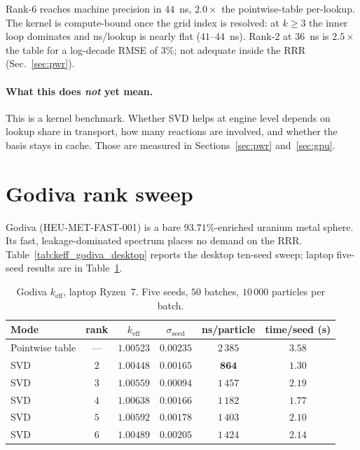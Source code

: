 \documentclass[11pt,a4paper]{article}
\begin{document}
Rank-$6$ reaches machine precision in $44$~ns, $2.0\times$
the pointwise-table per-lookup. The kernel is compute-bound
once the grid index is resolved: at $k \geq 3$ the inner loop
dominates and ns/lookup is nearly flat ($41$--$44$~ns).
Rank-$2$ at $36$~ns is $2.5\times$ the table for a log-decade
RMSE of $3\%$; not adequate inside the RRR
(Sec.~\ref{sec:pwr}).

\paragraph{What this does \emph{not} yet mean.}
This is a kernel benchmark. Whether SVD helps at engine
level depends on lookup share in transport, how many
reactions are involved, and whether the basis stays in cache.
Those are measured in Sections~\ref{sec:pwr} and~\ref{sec:gpu}.

\section{Godiva rank sweep}
\label{sec:godiva}

Godiva (HEU-MET-FAST-001) is a bare $93.71\%$-enriched
uranium metal sphere. Its fast, leakage-dominated spectrum
places no demand on the RRR.
Table~\ref{tab:keff_godiva_desktop} reports the desktop ten-seed
sweep; laptop five-seed results are in
Table~\ref{tab:keff_godiva}.

\begin{table}[htb]
\centering
\caption{Godiva $k_\text{eff}$, laptop Ryzen~$7$. Five seeds,
$50$ batches, $10\,000$ particles per batch.}
\label{tab:keff_godiva}
\begin{tabular}{@{}lccccc@{}}
\toprule
Mode & rank & $k_\text{eff}$ & $\sigma_\text{seed}$ & ns/particle & time/seed (s) \\
\midrule
Pointwise table & ---  & $1.00523$ & $0.00235$ & $2\,385$ & $3.58$ \\
SVD & $2$  & $1.00448$ & $0.00165$ & $\mathbf{864}$  & $\mathbf{1.30}$ \\
SVD & $3$  & $1.00559$ & $0.00094$ & $1\,457$ & $2.19$ \\
SVD & $4$  & $1.00638$ & $0.00166$ & $1\,182$ & $1.77$ \\
SVD & $5$  & $1.00592$ & $0.00178$ & $1\,403$ & $2.10$ \\
SVD & $6$  & $1.00489$ & $0.00205$ & $1\,424$ & $2.14$ \\
\bottomrule
\end{tabular}
\end{table}
\end{document}
